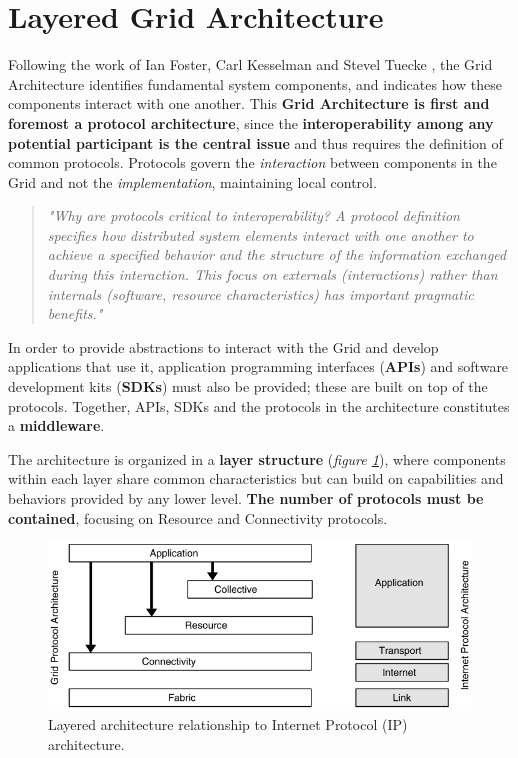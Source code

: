 \section{Layered Grid Architecture}\label{layered_grid_architecture}
Following the work of Ian Foster, Carl Kesselman and Stevel Tuecke \cite{the_anatomy_of_the_grid}, the Grid Architecture identifies fundamental system components, and indicates how these components interact with one another. This \textbf{Grid Architecture is first and foremost a protocol architecture}, since the \textbf{interoperability among any potential participant is the central issue} and thus requires the definition of common protocols. Protocols govern the \textit{interaction} between components in the Grid and not the \textit{implementation}, maintaining local control.

\begin{quotation}
    \textit{"Why are protocols critical to interoperability? A protocol definition specifies how distributed system elements interact with one another to achieve a specified behavior and the structure of the information exchanged during this interaction. This focus on externals (interactions) rather than internals (software, resource characteristics) has important pragmatic benefits." \cite{the_anatomy_of_the_grid}}
\end{quotation}

In order to provide abstractions to interact with the Grid and develop applications that use it, application programming interfaces (\textbf{APIs}) and software development kits (\textbf{SDKs}) must also be provided; these are built on top of the protocols.
Together, APIs, SDKs and the protocols in the architecture constitutes a \textbf{middleware}.

The architecture is organized in a \textbf{layer structure} (\textit{figure \ref{fig:grid_protocol_architecture_and_internet_protocol_architecture}}), where components within each layer share common characteristics but can build on capabilities and behaviors provided by any lower level. \textbf{The number of protocols must be contained}, focusing on Resource and Connectivity protocols.

\begin{figure}[!ht]
    \centering
    \includegraphics[scale=1]{document/chapters/chapter_2/images/grid_protocol_architecture_and_internet_protocol_architecture.png}
    \caption{Layered architecture relationship to Internet Protocol (IP) architecture. \cite{the_anatomy_of_the_grid}}
    \label{fig:grid_protocol_architecture_and_internet_protocol_architecture}
\end{figure}

